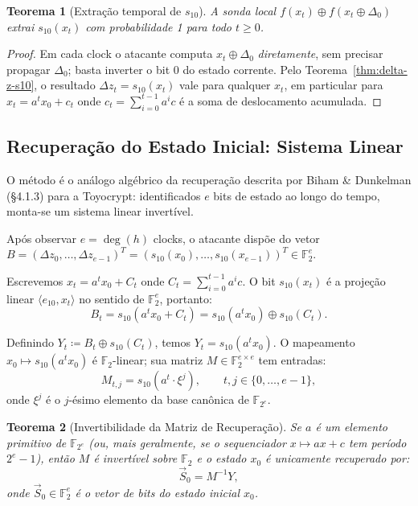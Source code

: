 \documentclass[12pt,a4paper]{article}
\newtheorem{theorem}{Teorema}[section]
\theoremstyle{definition}
\theoremstyle{remark}
\newcommand{\GF}[1]{\mathbb{F}_{2^{#1}}}
\newcommand{\GFtwo}{\mathbb{F}_2}
\newcommand{\xor}{\oplus}
\newcommand{\filter}{f}
\newcommand{\ks}{z}
\begin{document}
\begin{theorem}[Extração temporal de $s_{10}$]
  \label{thm:temporal}
  A sonda local $\filter(x_t) \xor \filter(x_t \xor \Delta_0)$ extrai
  $s_{10}(x_t)$ com probabilidade 1 para \emph{todo} $t \geq 0$.
\end{theorem}

\begin{proof}
  Em cada clock o atacante computa $x_t \xor \Delta_0$ \emph{diretamente},
  sem precisar propagar $\Delta_0$; basta inverter o bit 0 do estado corrente.
  Pelo Teorema~\ref{thm:delta-z-s10}, o resultado $\Delta\ks_t = s_{10}(x_t)$
  vale para qualquer $x_t$, em particular para $x_t = a^t x_0 + c_{t}$
  onde $c_t = \sum_{i=0}^{t-1} a^i c$ é a soma de deslocamento acumulada.
\end{proof}

\subsection{Recuperação do Estado Inicial: Sistema Linear}

\begin{paperref}
  O método é o análogo algébrico da recuperação descrita por Biham \&
  Dunkelman (\S4.1.3) para a Toyocrypt: identificados $e$ bits de estado
  ao longo do tempo, monta-se um sistema linear invertível.
\end{paperref}

Após observar $e = \deg(h)$ clocks, o atacante dispõe do vetor
$B = (\Delta\ks_0, \ldots, \Delta\ks_{e-1})^T = (s_{10}(x_0), \ldots,
s_{10}(x_{e-1}))^T \in \GFtwo^e$.

Escrevemos $x_t = a^t x_0 + C_t$ onde $C_t = \sum_{i=0}^{t-1}a^i c$.
O bit $s_{10}(x_t)$ é a projeção linear $\langle e_{10}, x_t \rangle$ no
sentido de $\GFtwo^e$, portanto:
\[
  B_t = s_{10}(a^t x_0 + C_t) = s_{10}(a^t x_0) \xor s_{10}(C_t).
\]

Definindo $Y_t \coloneqq B_t \xor s_{10}(C_t)$, temos $Y_t = s_{10}(a^t x_0)$.
O mapeamento $x_0 \mapsto s_{10}(a^t x_0)$ é $\GFtwo$-linear; sua matriz
$M \in \GFtwo^{e \times e}$ tem entradas:
\[
  M_{t,j} = s_{10}(a^t \cdot \xi^j), \qquad t,j \in \{0,\ldots,e-1\},
\]
onde $\xi^j$ é o $j$-ésimo elemento da base canônica de $\GF{e}$.

\begin{theorem}[Invertibilidade da Matriz de Recuperação]
  \label{thm:invertible}
  Se $a$ é um elemento primitivo de $\GF{e}$ (ou, mais geralmente, se
  o sequenciador $x \mapsto ax+c$ tem período $2^e - 1$), então $M$ é
  invertível sobre $\GFtwo$ e o estado $x_0$ é unicamente recuperado por:
  \[
    \vec{S}_0 = M^{-1} Y,
  \]
  onde $\vec{S}_0 \in \GFtwo^e$ é o vetor de bits do estado inicial $x_0$.
\end{theorem}
\end{document}
